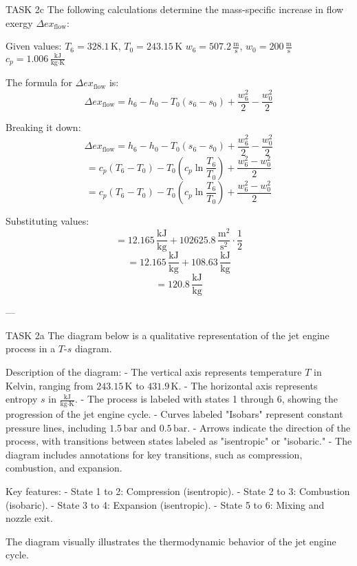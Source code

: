 TASK 2c  
The following calculations determine the mass-specific increase in flow exergy \( \Delta ex_{\text{flow}} \):

Given values:  
\( T_6 = 328.1 \, \text{K} \), \( T_0 = 243.15 \, \text{K} \)  
\( w_6 = 507.2 \, \frac{\text{m}}{\text{s}} \), \( w_0 = 200 \, \frac{\text{m}}{\text{s}} \)  
\( c_p = 1.006 \, \frac{\text{kJ}}{\text{kg·K}} \)

The formula for \( \Delta ex_{\text{flow}} \) is:  
\[
\Delta ex_{\text{flow}} = h_6 - h_0 - T_0 (s_6 - s_0) + \frac{w_6^2}{2} - \frac{w_0^2}{2}
\]

Breaking it down:  
\[
\Delta ex_{\text{flow}} = h_6 - h_0 - T_0 \left( s_6 - s_0 \right) + \frac{w_6^2}{2} - \frac{w_0^2}{2}
\]  
\[
= c_p (T_6 - T_0) - T_0 \left( c_p \ln \frac{T_6}{T_0} \right) + \frac{w_6^2 - w_0^2}{2}
\]  
\[
= c_p (T_6 - T_0) - T_0 \left( c_p \ln \frac{T_6}{T_0} \right) + \frac{w_6^2 - w_0^2}{2}
\]

Substituting values:  
\[
= 12.165 \, \frac{\text{kJ}}{\text{kg}} + 102625.8 \, \frac{\text{m}^2}{\text{s}^2} \cdot \frac{1}{2}
\]  
\[
= 12.165 \, \frac{\text{kJ}}{\text{kg}} + 108.63 \, \frac{\text{kJ}}{\text{kg}}
\]  
\[
= 120.8 \, \frac{\text{kJ}}{\text{kg}}
\]

---

TASK 2a  
The diagram below is a qualitative representation of the jet engine process in a \( T \)-\( s \) diagram.  

Description of the diagram:  
- The vertical axis represents temperature \( T \) in Kelvin, ranging from \( 243.15 \, \text{K} \) to \( 431.9 \, \text{K} \).  
- The horizontal axis represents entropy \( s \) in \( \frac{\text{kJ}}{\text{kg·K}} \).  
- The process is labeled with states 1 through 6, showing the progression of the jet engine cycle.  
- Curves labeled "Isobars" represent constant pressure lines, including \( 1.5 \, \text{bar} \) and \( 0.5 \, \text{bar} \).  
- Arrows indicate the direction of the process, with transitions between states labeled as "isentropic" or "isobaric."  
- The diagram includes annotations for key transitions, such as compression, combustion, and expansion.  

Key features:  
- State 1 to 2: Compression (isentropic).  
- State 2 to 3: Combustion (isobaric).  
- State 3 to 4: Expansion (isentropic).  
- State 5 to 6: Mixing and nozzle exit.  

The diagram visually illustrates the thermodynamic behavior of the jet engine cycle.